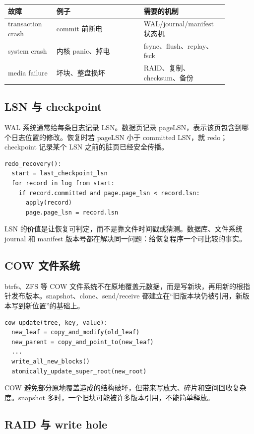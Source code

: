 \begin{longtable}{|p{0.2\linewidth}|p{0.36\linewidth}|p{0.32\linewidth}|}
\toprule
故障 & 例子 & 需要的机制 \\
\midrule
transaction crash & commit 前断电 & WAL/journal/manifest 状态机 \\\tablerowrule
system crash & 内核 panic、掉电 & fsync、flush、replay、fsck \\\tablerowrule
media failure & 坏块、整盘损坏 & RAID、复制、checksum、备份 \\
\bottomrule
\end{longtable}

\subsection{LSN 与 checkpoint}

WAL 系统通常给每条日志记录 LSN。数据页记录 pageLSN，表示该页包含到哪个日志位置的修改。恢复时若 pageLSN 小于 committed LSN，就 redo；checkpoint 记录某个 LSN 之前的脏页已经安全传播。

\begin{lstlisting}
redo_recovery():
  start = last_checkpoint_lsn
  for record in log from start:
    if record.committed and page.page_lsn < record.lsn:
      apply(record)
      page.page_lsn = record.lsn
\end{lstlisting}

LSN 的价值是让恢复可判定，而不是靠文件时间戳或猜测。数据库、文件系统 journal 和 manifest 版本号都在解决同一问题：给恢复程序一个可比较的事实。

\subsection{COW 文件系统}

btrfs、ZFS 等 COW 文件系统不在原地覆盖元数据，而是写新块，再用新的根指针发布版本。snapshot、clone、send/receive 都建立在“旧版本块仍被引用，新版本写到新位置”的基础上。

\begin{lstlisting}
cow_update(tree, key, value):
  new_leaf = copy_and_modify(old_leaf)
  new_parent = copy_and_point_to(new_leaf)
  ...
  write_all_new_blocks()
  atomically_update_super_root(new_root)
\end{lstlisting}

COW 避免部分原地覆盖造成的结构破坏，但带来写放大、碎片和空间回收复杂度。snapshot 多时，一个旧块可能被许多版本引用，不能简单释放。

\subsection{RAID 与 write hole}

